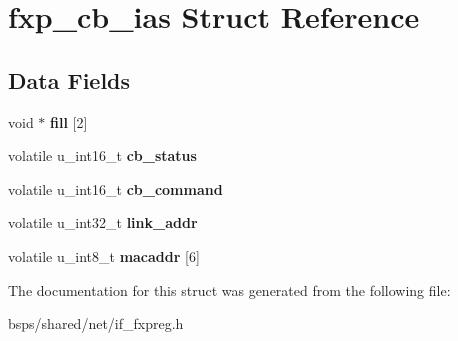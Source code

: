 \hypertarget{structfxp__cb__ias}{}\section{fxp\+\_\+cb\+\_\+ias Struct Reference}
\label{structfxp__cb__ias}
\subsection*{Data Fields}
\begin{DoxyCompactItemize}
\item 
\mbox{\label{structfxp__cb__ias_a08647a0b17cddc1f3ca58adff5d5249e}} 
void $\ast$ {\bfseries fill} \mbox{[}2\mbox{]}
\item 
\mbox{\label{structfxp__cb__ias_a4c19f5f9e4bebde41f188a75b1f1d6c3}} 
volatile u\+\_\+int16\+\_\+t {\bfseries cb\+\_\+status}
\item 
\mbox{\label{structfxp__cb__ias_a503ab4ed6bc2b17d2cbeb4b4a42b9808}} 
volatile u\+\_\+int16\+\_\+t {\bfseries cb\+\_\+command}
\item 
\mbox{\label{structfxp__cb__ias_a1911eeb003c6e3d385e5b46fbbe8b11d}} 
volatile u\+\_\+int32\+\_\+t {\bfseries link\+\_\+addr}
\item 
\mbox{\label{structfxp__cb__ias_ac6e2b24d63dbd5f4e0058a3b694a13e0}} 
volatile u\+\_\+int8\+\_\+t {\bfseries macaddr} \mbox{[}6\mbox{]}
\end{DoxyCompactItemize}


The documentation for this struct was generated from the following file\+:\begin{DoxyCompactItemize}
\item 
bsps/shared/net/if\+\_\+fxpreg.\+h\end{DoxyCompactItemize}
